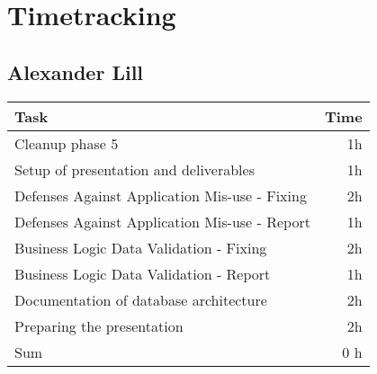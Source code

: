 \chapter{Timetracking}\label{chapter:timetracking}
\section*{Alexander Lill}
\begin{table}[h!tpb]
  \centering
  \begin{tabularx}{\textwidth}{X r}
    \toprule
      Task & Time \\
    \midrule
      Cleanup phase 5 & 1h \\
      Setup of presentation and deliverables & 1h \\
      Defenses Against Application Mis-use - Fixing & 2h \\
      Defenses Against Application Mis-use - Report & 1h \\
      Business Logic Data Validation - Fixing & 2h \\
      Business Logic Data Validation - Report & 1h \\
      Documentation of database architecture & 2h \\
      Preparing the presentation & 2h \\ %
    \midrule
      Sum & 0 h \\
    \bottomrule
  \end{tabularx}
\end{table}

\clearpage
